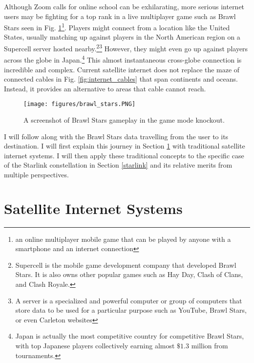 \documentclass[10pt]{article}
\begin{document}
Although Zoom calls for online school can be exhilarating, more serious internet users may be fighting for a top rank in a live multiplayer game such as Brawl Stars seen in Fig. \ref{fig:brawlstars}\footnote{an online multiplayer mobile game that can be played by anyone with a smartphone and an internet connection}. Players might connect from a location like the United States, usually matching up against players in the North American region on a Supercell server hosted nearby.\footnote{Supercell is the mobile game development company that developed Brawl Stars. It is also owns other popular games such as Hay Day, Clash of Clans, and Clash Royale.}\footnote{A server is a specialized and powerful computer or group of computers that store data to be used for a particular purpose such as YouTube, Brawl Stars, or even Carleton websites} However, they might even go up against players across the globe in Japan.\footnote{Japan is actually the most competitive country for competitive Brawl Stars, with top Japanese players collectively earning almost $\$1.3$ million from tournaments\cite{brawl_countries}.} This almost instantaneous cross-globe connection is incredible and complex. Current satellite internet does not replace the maze of connected cables in Fig. \ref{fig:internet_cables} that span continents and oceans. Instead, it provides an alternative to areas that cable cannot reach.

\begin{figure}[h!]
\centering
\texttt{[image: figures/brawl\_stars.PNG]}
\caption{A screenshot of Brawl Stars gameplay in the game mode knockout.}
\label{fig:brawlstars}
\end{figure}

I will follow along with the Brawl Stars data travelling from the user to its destination. I will first explain this journey in Section \ref{satellite_internet} with traditional satellite internet systems. I will then apply these traditional concepts to the specific case of the Starlink constellation in Section \ref{starlink} and its relative merits from multiple perspectives.

\section{Satellite Internet Systems}
\label{satellite_internet}
\end{document}
